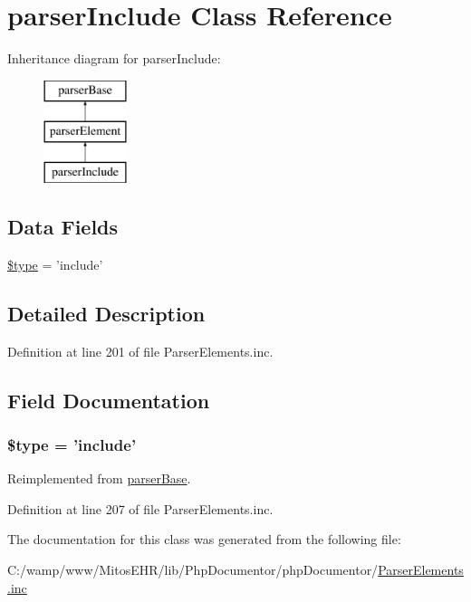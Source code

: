 \hypertarget{classparser_include}{\section{parser\-Include \-Class \-Reference}
\label{classparser_include}
}
\-Inheritance diagram for parser\-Include\-:\begin{figure}[H]
\begin{center}
\leavevmode
\includegraphics[height=3.000000cm]{classparser_include}
\end{center}
\end{figure}
\subsection*{\-Data \-Fields}
\begin{DoxyCompactItemize}
\item 
\hyperlink{classparser_include_a9a4a6fba2208984cabb3afacadf33919}{\$type} = 'include'
\end{DoxyCompactItemize}


\subsection{\-Detailed \-Description}


\-Definition at line 201 of file \-Parser\-Elements.\-inc.



\subsection{\-Field \-Documentation}
\hypertarget{classparser_include_a9a4a6fba2208984cabb3afacadf33919}{
\subsubsection[{\$type}]{\setlength{\rightskip}{0pt plus 5cm}\$type = 'include'}}\label{classparser_include_a9a4a6fba2208984cabb3afacadf33919}


\-Reimplemented from \hyperlink{classparser_base_a9a4a6fba2208984cabb3afacadf33919}{parser\-Base}.



\-Definition at line 207 of file \-Parser\-Elements.\-inc.



\-The documentation for this class was generated from the following file\-:\begin{DoxyCompactItemize}
\item 
\-C\-:/wamp/www/\-Mitos\-E\-H\-R/lib/\-Php\-Documentor/php\-Documentor/\hyperlink{_parser_elements_8inc}{\-Parser\-Elements.\-inc}\end{DoxyCompactItemize}
